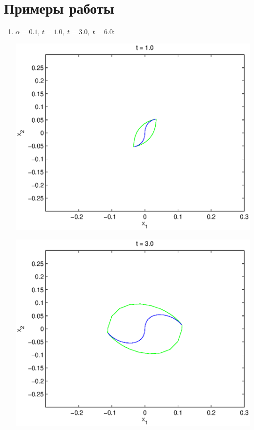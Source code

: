 \documentclass[11pt]{article}
\begin{document}
\section{Примеры работы}
\begin{enumerate}
\item
$\alpha = 0.1$, $t = 1.0, \; t = 3.0, \; t = 6.0$:

\includegraphics[scale=1.0]{pics/a0.1t1.eps}

\includegraphics[scale=1.0]{pics/a0.1t3.eps}


\end{enumerate}
\end{document}
